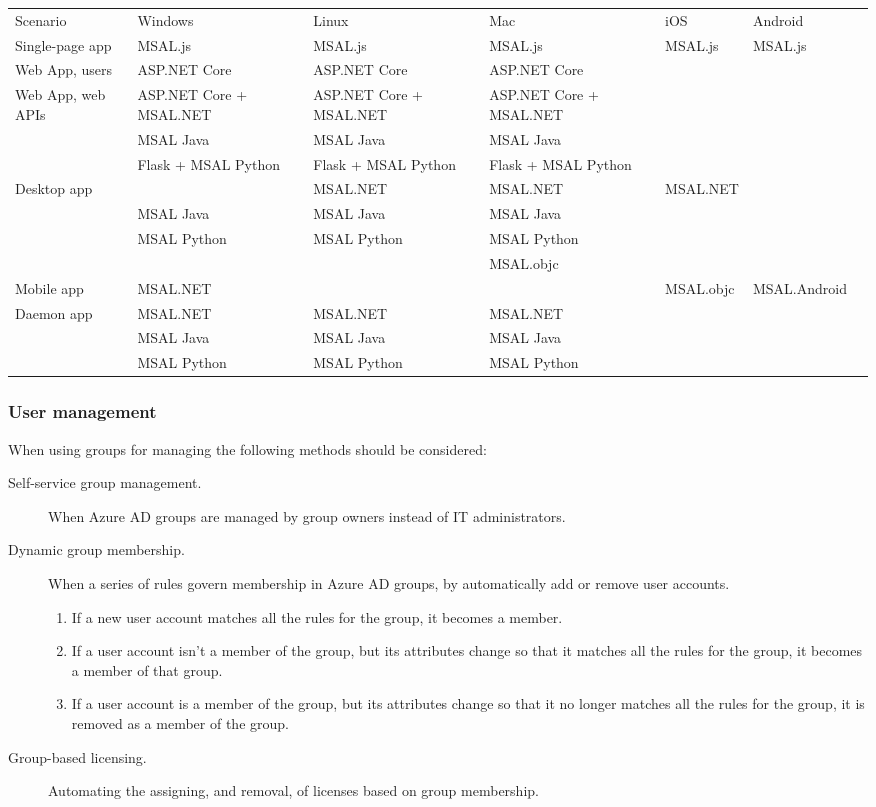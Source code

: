 \begin{table}[!h]\footnotesize \begin{tabular}{p{2.6cm} p{1.6cm} p{2cm} p{2cm} p{2cm} p{1.5cm} p{1.5cm}}
Scenario & Windows & Linux & Mac & iOS & Android \\
Single-page app & MSAL.js & MSAL.js & MSAL.js & MSAL.js & MSAL.js \\
Web App, users & ASP.NET Core & ASP.NET Core & ASP.NET Core & & \\
Web App, web APIs & ASP.NET Core + MSAL.NET & ASP.NET Core + MSAL.NET  & ASP.NET Core + MSAL.NET & & \\
 & MSAL Java & MSAL Java & MSAL Java & & \\
 & Flask + MSAL Python & Flask + MSAL Python & Flask + MSAL Python & & \\
Desktop app & & MSAL.NET & MSAL.NET & MSAL.NET & & \\
 & MSAL Java & MSAL Java & MSAL Java & & \\
 & MSAL Python & MSAL Python & MSAL Python & & \\
 & & & MSAL.objc & & \\
Mobile app & MSAL.NET & & & MSAL.objc & MSAL.Android \\ 
Daemon app & MSAL.NET & MSAL.NET & MSAL.NET & & \\
 & MSAL Java & MSAL Java & MSAL Java & & \\
 & MSAL Python & MSAL Python & MSAL Python & & \\
\end{tabular}\end{table}

\subsubsection{User management}
When using groups for managing the following methods should be considered:
\begin{description}
\item[Self-service group management.] When Azure AD groups are managed by group owners instead of IT administrators.
\item[Dynamic group membership.] When a series of rules govern membership in Azure AD groups, by automatically add or remove user accounts. \begin{enumerate} \item If a new user account matches all the rules for the group, it becomes a member. \item If a user account isn’t a member of the group, but its attributes change so that it matches all the rules for the group, it becomes a member of that group. \item If a user account is a member of the group, but its attributes change so that it no longer matches all the rules for the group, it is removed as a member of the group. \end{enumerate}
\item[Group-based licensing.] Automating the assigning, and removal, of licenses based on group membership.
\end{description}

